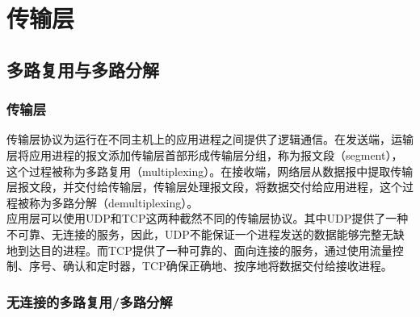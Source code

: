 \chapter{传输层}

\section{多路复用与多路分解}

\subsection{传输层}

传输层协议为运行在不同主机上的应用进程之间提供了逻辑通信。在发送端，运输层将应用进程的报文添加传输层首部形成传输层分组，称为报文段（segment），这个过程被称为多路复用（multiplexing）。在接收端，网络层从数据报中提取传输层报文段，并交付给传输层，传输层处理报文段，将数据交付给应用进程，这个过程被称为多路分解（demultiplexing）。\\

应用层可以使用UDP和TCP这两种截然不同的传输层协议。其中UDP提供了一种不可靠、无连接的服务，因此，UDP不能保证一个进程发送的数据能够完整无缺地到达目的进程。而TCP提供了一种可靠的、面向连接的服务，通过使用流量控制、序号、确认和定时器，TCP确保正确地、按序地将数据交付给接收进程。\\

\subsection{无连接的多路复用/多路分解}

